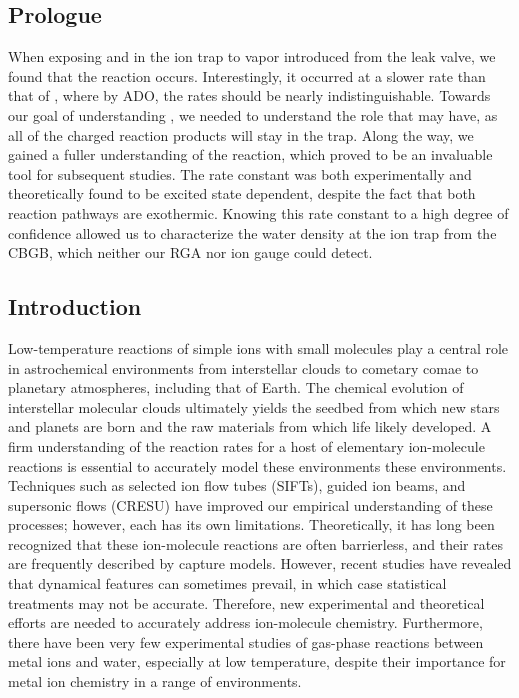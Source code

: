 \subsection{Prologue}
When exposing  and  in the ion trap to  vapor introduced from the leak valve, we found that the reaction  occurs. Interestingly, it occurred at a slower rate than that of , where by ADO, the rates should be nearly indistinguishable. Towards our goal of understanding , we needed to understand the role that  may have, as all of the charged reaction products will stay in the trap. Along the way, we gained a fuller understanding of the  reaction, which proved to be an invaluable tool for subsequent studies. The rate constant was both experimentally and theoretically found to be excited state dependent, despite the fact that both reaction pathways are exothermic. Knowing this rate constant to a high degree of confidence allowed us to characterize the water density at the ion trap from the CBGB, which neither our RGA nor ion gauge could detect.

\subsection{Introduction}
Low-temperature reactions of simple ions with small molecules play a central role in astrochemical environments from interstellar clouds to cometary comae to planetary atmospheres, including that of Earth\cite{Agundez2013,Krasnopolsky2014}. The chemical evolution of interstellar molecular clouds ultimately yields the seedbed from which new stars and planets are born and the raw materials from which life likely developed. A firm understanding of the reaction rates for a host of elementary ion-molecule reactions is essential to accurately model these environments these environments. Techniques such as selected ion flow tubes (SIFTs)\cite{Adams1976}, guided ion beams\cite{Armentrout2002}, and supersonic flows (CRESU)\cite{Sims2002} have improved our empirical understanding of these processes; however, each has its own limitations.\cite{Smith2000,Snow2008} Theoretically, it has long been recognized that these ion-molecule reactions are often barrierless, and their rates are frequently described by capture models.\cite{Gioumousis1958a} However, recent studies have revealed that dynamical features can sometimes prevail,\cite{Lourderaj2008,Li2014,Carrascosa2017} in which case statistical treatments may not be accurate.\cite{Hase2014,Clary1990} Therefore, new experimental and theoretical efforts are needed to accurately address ion-molecule chemistry. Furthermore, there have been very few experimental studies of gas-phase reactions between metal ions and water, especially at low temperature, despite their importance for metal ion chemistry in a range of environments.\cite{Highberger2001,Oppenheimer2002,VanDishoeck2013a}

